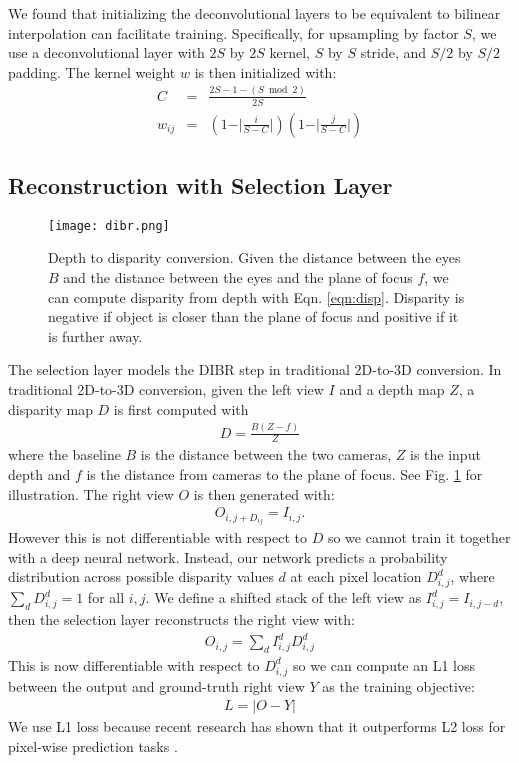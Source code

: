 \documentclass[runningheads]{llncs}
\begin{document}
We found that initializing the deconvolutional layers to be equivalent to bilinear interpolation can facilitate training.
Specifically, for upsampling by factor $S$, we use a deconvolutional layer with $2S$ by $2S$ kernel, $S$ by $S$ stride, and $S/2$ by $S/2$ padding. The kernel weight $w$ is then initialized with:
\begin{eqnarray}
C &=& \frac{2S - 1 - (S \bmod 2)}{2S}\\
w_{ij} &=& (1 - \vert \frac{i}{S-C}\vert)(1 - \vert \frac{j}{S-C} \vert)
\end{eqnarray}\subsection{Reconstruction with Selection Layer}\label{sec:dibr}\begin{figure}[!t]
\centering
\texttt{[image: dibr.png]}
\vspace{-0.6in}
\caption{Depth to disparity conversion. Given the distance between the eyes $B$ and the distance between the eyes and the plane of focus $f$, we can compute disparity from depth with Eqn. \ref{eqn:disp}. Disparity is negative if object is closer than the plane of focus and positive if it is further away.}
\label{fig:dibr}
\end{figure}
The selection layer models the DIBR step in traditional 2D-to-3D conversion.
In traditional 2D-to-3D conversion, given the left view $I$ and a depth map $Z$, a disparity map $D$ is first computed with
\begin{eqnarray}
D = \frac{B(Z-f)}{Z}
\label{eqn:disp}
\end{eqnarray}
where the baseline $B$ is the distance between the two cameras, $Z$ is the input depth and $f$ is the distance from cameras to the plane of focus. See Fig. \ref{fig:dibr} for illustration.
The right view $O$ is then generated with:
\begin{eqnarray}
O_{i, j+D_{ij}} = I_{i,j}.
\end{eqnarray}
However this is not differentiable with respect to $D$ so we cannot train it together with a deep neural network.
Instead, our network predicts a probability distribution across possible disparity values $d$ at each pixel location $D_{i,j}^d$, where $\sum_d D_{i,j}^d = 1$ for all $i, j$.
We define a shifted stack of the left view as $I_{i,j}^d = I_{i,j-d}$, then the selection layer reconstructs the right view with:
\begin{eqnarray}
O_{i,j} = \sum_d I_{i,j}^d D_{i,j}^d
\end{eqnarray}
This is now differentiable with respect to $D_{i,j}^d$ so we can compute an L1 loss between the output and ground-truth right view $Y$ as the training objective:
\begin{eqnarray}
L = \vert O - Y \vert
\end{eqnarray}
We use L1 loss because recent research has shown that it outperforms L2 loss for pixel-wise prediction tasks \cite{mathieu2015deep}.
\end{document}
